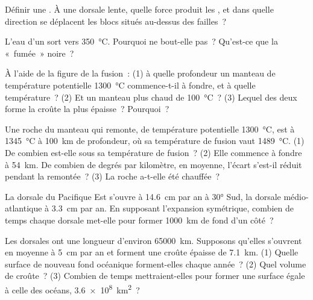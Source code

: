\begin{exercise}[$\star$]\label{exo:g11:ocean-ridges:4}
Définir une . À une dorsale lente, quelle force produit les
, et dans quelle direction se déplacent les blocs situés
au-dessus des failles~?
\end{exercise}

\begin{exercise}[$\star$]\label{exo:g11:ocean-ridges:5}
L'eau d'un  sort vers \qty{350}{\celsius}. Pourquoi ne bout-elle
pas~? Qu'est-ce que la «~fumée~» noire~?
\end{exercise}

\begin{exercise}[$\star\star$]\label{exo:g11:ocean-ridges:6}
À l'aide de la figure de la fusion~: (1) à quelle profondeur un manteau de
température potentielle \qty{1300}{\celsius} commence-t-il à fondre, et à
quelle température~? (2) Et un manteau plus chaud de \qty{100}{\celsius}~?
(3) Lequel des deux forme la croûte la plus épaisse~? Pourquoi~?
\end{exercise}

\begin{exercise}[$\star\star$]\label{exo:g11:ocean-ridges:7}
Une roche du manteau qui remonte, de température potentielle
\qty{1300}{\celsius}, est à \qty{1345}{\celsius} à \qty{100}{km} de
profondeur, où sa température de fusion vaut \qty{1489}{\celsius}. (1) De
combien est-elle sous sa température de fusion~? (2) Elle commence à fondre
à \qty{54}{km}. De combien de degrés par kilomètre, en moyenne, l'écart
s'est-il réduit pendant la remontée~? (3) La roche a-t-elle été chauffée~?
\end{exercise}

\begin{exercise}[$\star\star$]\label{exo:g11:ocean-ridges:8}
La dorsale du Pacifique Est s'ouvre à \qty{14.6}{cm} par an à \ang{30} Sud,
la dorsale médio-atlantique à \qty{3.3}{cm} par an. En supposant
l'expansion symétrique, combien de temps chaque dorsale met-elle pour
former \qty{1000}{km} de fond d'un côté~?
\end{exercise}

\begin{exercise}[$\star\star$]\label{exo:g11:ocean-ridges:9}
Les dorsales ont une longueur d'environ \qty{65000}{km}. Supposons qu'elles
s'ouvrent en moyenne à \qty{5}{cm} par an et forment une croûte épaisse de
\qty{7.1}{km}. (1) Quelle surface de nouveau fond océanique forment-elles
chaque année~? (2) Quel volume de croûte~? (3) Combien de temps
mettraient-elles pour former une surface égale à celle des océans,
\qty{3.6e8}{km^2}~?
\end{exercise}

